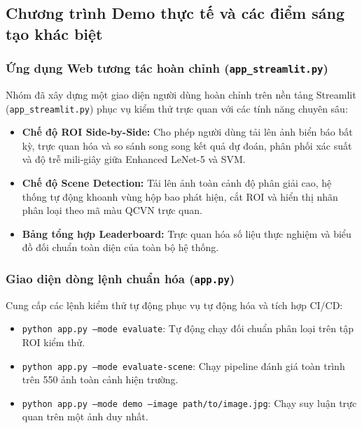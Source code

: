 \subsection{Chương trình Demo thực tế và các điểm sáng tạo khác biệt}
\label{subsec:demo_va_sang_tao}

\subsubsection{Ứng dụng Web tương tác hoàn chỉnh (\texttt{app\_streamlit.py})}
\label{subsubsec:demo_streamlit}

Nhóm đã xây dựng một giao diện người dùng hoàn chỉnh trên nền tảng Streamlit (\texttt{app\_streamlit.py}) phục vụ kiểm thử trực quan với các tính năng chuyên sâu:

\begin{itemize}
    \item \textbf{Chế độ ROI Side-by-Side:} Cho phép người dùng tải lên ảnh biển báo bất kỳ, trực quan hóa và so sánh song song kết quả dự đoán, phân phối xác suất và độ trễ mili-giây giữa Enhanced LeNet-5 và SVM.
    \item \textbf{Chế độ Scene Detection:} Tải lên ảnh toàn cảnh độ phân giải cao, hệ thống tự động khoanh vùng hộp bao phát hiện, cắt ROI và hiển thị nhãn phân loại theo mã màu QCVN trực quan.
    \item \textbf{Bảng tổng hợp Leaderboard:} Trực quan hóa số liệu thực nghiệm và biểu đồ đối chuẩn toàn diện của toàn bộ hệ thống.
\end{itemize}

\subsubsection{Giao diện dòng lệnh chuẩn hóa (\texttt{app.py})}
\label{subsubsec:demo_cli}

Cung cấp các lệnh kiểm thử tự động phục vụ tự động hóa và tích hợp CI/CD:
\begin{itemize}
    \item \texttt{python app.py --mode evaluate}: Tự động chạy đối chuẩn phân loại trên tập ROI kiểm thử.
    \item \texttt{python app.py --mode evaluate-scene}: Chạy pipeline đánh giá toàn trình trên 550 ảnh toàn cảnh hiện trường.
    \item \texttt{python app.py --mode demo --image path/to/image.jpg}: Chạy suy luận trực quan trên một ảnh duy nhất.
\end{itemize}

